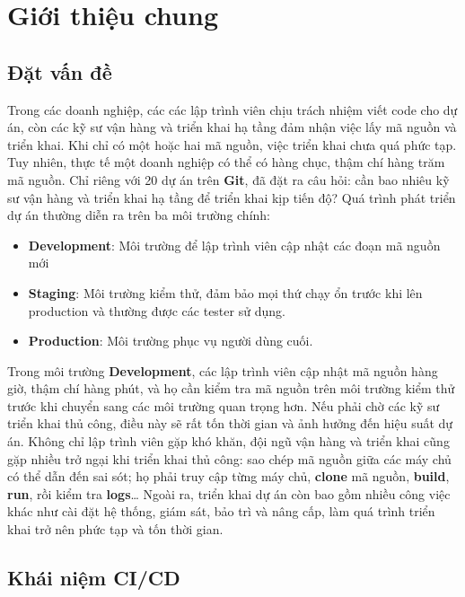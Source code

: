
\chapter{Giới thiệu chung}

\section{Đặt vấn đề}
Trong các doanh nghiệp, các các lập trình viên chịu trách nhiệm viết code cho dự án, còn các kỹ sư vận hàng và triển khai hạ tầng đảm nhận việc lấy mã nguồn và triển khai. Khi chỉ có một hoặc hai mã nguồn, việc triển khai chưa quá phức tạp. Tuy nhiên, thực tế một doanh nghiệp có thể có hàng chục, thậm chí hàng trăm mã nguồn. Chỉ riêng với 20 dự án trên \textbf{Git}, đã đặt ra câu hỏi: cần bao nhiêu kỹ sư vận hàng và triển khai hạ tầng để triển khai kịp tiến độ?
Quá trình phát triển dự án thường diễn ra trên ba môi trường chính:
\begin{itemize}
	\item \textbf{Development}: Môi trường để lập trình viên cập nhật các đoạn mã nguồn mới
	\item \textbf{Staging}: Môi trường kiểm thử, đảm bảo mọi thứ chạy ổn trước khi lên production và thường được các tester sử dụng.
	\item \textbf{Production}: Môi trường phục vụ người dùng cuối.
\end{itemize}



Trong môi trường \textbf{Development}, các lập trình viên cập nhật mã nguồn  hàng giờ, thậm chí hàng phút, và họ cần kiểm tra mã nguồn trên môi trường kiểm thử trước khi chuyển sang các môi trường quan trọng hơn. Nếu phải chờ các kỹ sư triển khai thủ công, điều này sẽ rất tốn thời gian và ảnh hưởng đến hiệu suất dự án.
Không chỉ lập trình viên gặp khó khăn, đội ngũ vận hàng và triển khai cũng gặp nhiều trở ngại khi triển khai thủ công: sao chép mã nguồn giữa các máy chủ có thể dẫn đến sai sót; họ phải truy cập từng máy chủ, \textbf{clone} mã nguồn, \textbf{build}, \textbf{run}, rồi kiểm tra \textbf{logs}… Ngoài ra, triển khai dự án còn bao gồm nhiều công việc khác như cài đặt hệ thống, giám sát, bảo trì và nâng cấp, làm quá trình triển khai trở nên phức tạp và tốn thời gian.

\section{Khái niệm CI/CD}

